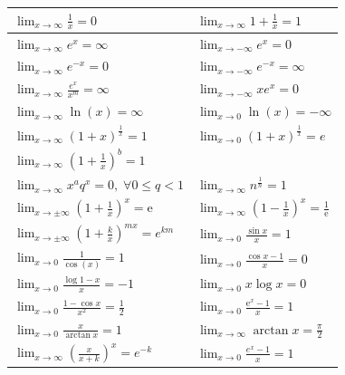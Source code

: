 \bgroup
\def\arraystretch{2}
\begin{center}
	\begin{tabular}{ | l | l | }
		 \hline
                $\lim_{x\to\infty} \frac{1}{x} = 0$ & $\lim_{x\to\infty} 1 + \frac{1}{x} = 1$ \\
		 \hline
                $\lim_{x \to \infty} e^x = \infty$ & $\lim_{x \to - \infty} e^x = 0$ \\
                 \hline
                $\lim_{x \to \infty} e^{-x} = 0$ & $\lim_{x \to - \infty} e^{-x} = \infty$ \\
                 \hline
                $\lim_{x \to \infty} \frac{e^x}{x^m} = \infty$ & $\lim_{x \to - \infty} xe^x = 0$ \\
                 \hline
                $\lim_{x \to \infty} \ln(x) = \infty$ & $\lim_{x \to 0} \ln(x) = - \infty$ \\
                 \hline
                $\lim_{x \to \infty} (1 + x)^{\frac{1}{x}} = 1$ & $\lim_{x \to 0} (1 + x)^{\frac{1}{x}} = e$ \\
                 \hline
	 	$\lim_{x\to\infty} \left(1 + \frac{1}{x}\right)^b = 1$ &  \\
		 \hline  
	 	$\lim_{x\to\infty} x^aq^x = 0, \; \forall 0 \leq q < 1$ & $\lim_{x\to\infty} n^\frac{1}{n} = 1$ \\
		 \hline
                $\lim_{x\to \pm \infty} \left(1+\frac{1}{x}\right)^x = \mathrm{e}$ & $\lim_{x\to \infty} \left(1-\frac{1}{x}\right)^x = \frac{1}{\mathrm{e}}$ \\
		 \hline
                $\lim_{x \to \pm \infty} \left(1+\frac{k}{x}\right)^{mx} = e^{km}$ & $\lim_{x \to 0} \frac{\sin{x}}{x} = 1$ \\
                 \hline
                $\lim_{x\to 0} \frac{1}{\cos(x)} = 1$ & $\lim_{x\to 0} \frac{\cos{x}-1}{x} = 0$ \\
                 \hline
                $\lim_{x\to 0} \frac{\log{1-x}}{x} = -1$ & $\lim_{x\to 0} x\log{x} = 0$ \\
                 \hline
                $\lim_{x\to 0} \frac{1-\cos{x}}{x^2} = \frac{1}{2}$ & $\lim_{x\to 0} \frac{\mathrm{e}^x-1}{x} = 1$ \\
                 \hline
                $\lim_{x\to 0} \frac{x}{\arctan{x}} = 1$ & $\lim_{x\to\infty} \arctan{x} = \frac{\pi}{2}$ \\
                 \hline
                $\lim_{x \to \infty} \left(\frac{x}{x + k}\right)^x = e^{-k}$ & $\lim_{x \to 0} \frac{e^x - 1}{x} = 1$ \\

\end{tabular}
\end{center}
